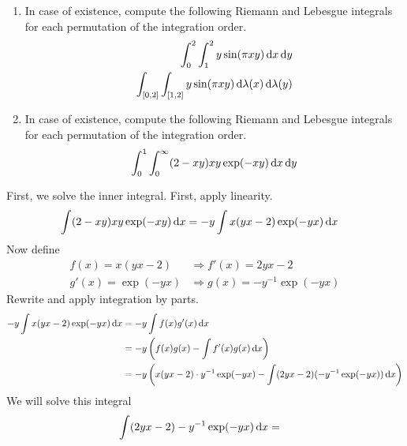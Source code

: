 \begin{question}
    \begin{enumerate}
        \item In case of existence, compute the following Riemann and Lebesgue integrals for each permutation of the integration order.
        \begin{align}
            \int_0^2 \int_1^2 y \sin (\pi x y) \mathop{}\!\mathrm{d} x \mathop{}\!\mathrm{d} y \\
            \int_{[0, 2]} \int_{[1, 2]} y \sin (\pi x y) \mathop{}\!\mathrm{d} \lambda(x) \mathop{}\!\mathrm{d} \lambda(y)
        \end{align}
        \item In case of existence, compute the following Riemann and Lebesgue integrals for each permutation of the integration order.
        \begin{align}
            \int_0^1 \int_0^\infty (2 - xy) xy \exp(-xy) \mathop{}\!\mathrm{d} x \mathop{}\!\mathrm{d} y
        \end{align}
    \end{enumerate}
\end{question}
\begin{solution}
    First, we solve the inner integral. First, apply linearity.
    \begin{align}
        \int (2 - xy) xy \exp(-xy) \mathop{}\!\mathrm{d} x &= -y \int x(yx - 2) \exp(-yx) \mathop{}\!\mathrm{d} x
    \end{align}
    Now define
    \begin{align}
        f(x) = x (yx - 2) &\Rightarrow f'(x) = 2yx - 2\\
        g'(x) = \exp(-yx) &\Rightarrow g(x) = - y^{-1} \exp(-yx)
    \end{align}
    Rewrite and apply integration by parts.
    \begin{align}
        -y \int x(yx - 2) \exp(-yx) \mathop{}\!\mathrm{d} x &= -y \int f(x) g'(x) \mathop{}\!\mathrm{d} x \\
        &= -y \left( f(x)g(x) - \int f'(x)g(x)\mathop{}\!\mathrm{d} x \right) \\
        &= -y \left( x(yx - 2) \cdot y^{-1} \exp(-yx) - \int (2yx - 2) (-y^{-1} \exp(-yx)) \mathop{}\!\mathrm{d} x\right)
    \end{align}
    We will solve this integral
    \begin{align}
        \int (2yx - 2) -y^{-1} \exp(-yx) \mathop{}\!\mathrm{d} x &= 
    \end{align}
\end{solution}